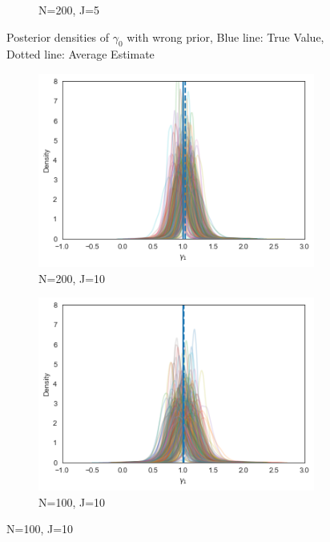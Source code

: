 \begin{figure}[h!]
\begin{subfigure}[b]{0.3\linewidth}
    \caption{N=200, J=5}
  \end{subfigure}
  \caption{Posterior densities of $\gamma_0$ with wrong prior, Blue line: True Value, Dotted line: Average Estimate}
  \label{fig:posterior_wrong_gamma0}
\end{figure}


\begin{figure}[h!]
  \centering
  \begin{subfigure}[b]{0.3\linewidth}
    \includegraphics[width=\linewidth]{graphics/posterior_plot_gamma1_wrong}
    \caption{ N=200, J=10}
  \end{subfigure}
  \begin{subfigure}[b]{0.3\linewidth}
    \includegraphics[width=\linewidth]{graphics/posterior_plot_gamma1_wrong_smallN}
    \caption{ N=100, J=10}
  \end{subfigure}

\end{figure}
